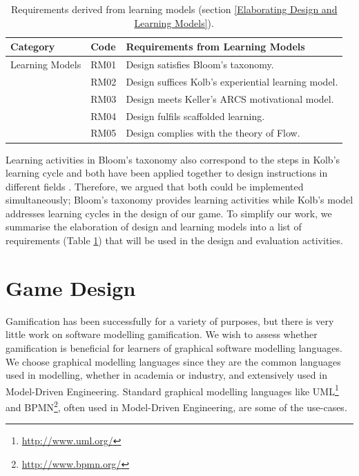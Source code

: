 \documentclass[12pt, a4paper]{report}
\begin{document}
{\begin{table}[ht]
\caption{Requirements derived from learning models (section \ref{Elaborating Design and Learning Models}).}
\label{design-learning-models}
\begin{center}
\begin{tabular}{ p{2cm}p{1cm}p{10cm} } 
\hline
Category & Code & Requirements from Learning Models \\
\hline
\multirow{1}{2cm}{Learning Models} 
& RM01 & Design satisfies Bloom's taxonomy. \\
& RM02 & Design suffices Kolb's experiential learning model. \\ 
& RM03 & Design meets Keller's ARCS motivational model. \\
& RM04 & Design fulfils scaffolded learning. \\
& RM05 & Design complies with the theory of Flow. \\ 
\hline
\end{tabular}
\end{center}
\end{table}

Learning activities in Bloom's taxonomy also correspond to the steps in Kolb's learning cycle \cite{murphy2007prior} and both have been applied together to design instructions in different fields \cite{terry1993kolb, howard1996felder, schatzberg2002applying}. Therefore, we argued that both could be implemented simultaneously; Bloom's taxonomy provides learning activities while Kolb's model addresses learning cycles in the design of our game. To simplify our work, we summarise the elaboration of design and learning models into a list of requirements (Table \ref{design-learning-models}) that will be used in the design and evaluation activities.

\section{Game Design}
\label{Game Design}
Gamification has been successfully for a variety of purposes, but there is very little work on software modelling gamification. We wish to assess whether gamification is beneficial for learners of graphical software modelling languages. We choose graphical modelling languages since they are the common languages used in modelling, whether in academia or industry, and extensively used in Model-Driven Engineering. Standard graphical modelling languages like UML\footnote{\url{http://www.uml.org/}} and BPMN\footnote{\url{http://www.bpmn.org/}}, often used in Model-Driven Engineering, are some of the use-cases.        

}
\end{document}
